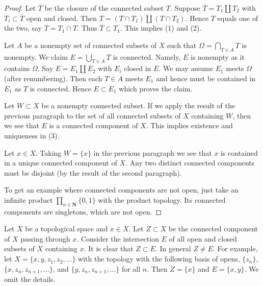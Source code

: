 \begin{proof}
Let $\overline{T}$ be the closure of the connected subset $T$.
Suppose $\overline{T} = T_1 \amalg T_2$ with $T_i \subset \overline{T}$
open and closed. Then $T = (T\cap T_1) \amalg (T \cap T_2)$. Hence
$T$ equals one of the two, say $T = T_1 \cap T$. Thus
$\overline{T} \subset T_1$. This implies (1) and (2).

\medskip\noindent
Let $A$ be a nonempty set of connected subsets of $X$ such that
$\Omega = \bigcap_{T \in A} T$ is nonempty. We claim $E = \bigcup_{T \in A} T$
is connected. Namely, $E$ is nonempty as it contains $\Omega$.
Say $E = E_1 \amalg E_2$ with $E_i$ closed in $E$. We may assume
$E_1$ meets $\Omega$ (after renumbering). Then each $T \in A$ meets $E_1$
and hence must be contained in $E_1$ as $T$ is connected. Hence $E \subset E_1$
which proves the claim.

\medskip\noindent
Let $W \subset X$ be a nonempty connected subset.
If we apply the result of the previous paragraph to the set of all
connected subsets of $X$ containing $W$, then we see that $E$ is
a connected component of $X$. This implies existence and uniqueness in (3).

\medskip\noindent
Let $x \in X$. Taking $W = \{x\}$ in the previous paragraph
we see that $x$ is contained in a unique connected component of $X$.
Any two distinct connected components must be disjoint (by the
result of the second paragraph).

\medskip\noindent
To get an example where connected components are not open, just take
an infinite product $\prod_{n \in \mathbf{N}} \{0, 1\}$
with the product topology. Its connected components are singletons,
which are not open.
\end{proof}

\begin{remark}
\label{remark-quasi-components}
\begin{reference}
\cite[Example 6.1.24]{Engelking}
\end{reference}
Let $X$ be a topological space and $x \in X$. Let $Z \subset X$ be the
connected component of $X$ passing through $x$. Consider the intersection
$E$ of all open and closed subsets of $X$ containing $x$. It is clear that
$Z \subset E$. In general $Z \not = E$. For example, let
$X = \{x, y, z_1, z_2, \ldots\}$ with the topology with the following
basis of opens, $\{z_n\}$, $\{x, z_n, z_{n + 1}, \ldots\}$, and
$\{y, z_n, z_{n + 1}, \ldots\}$ for all $n$. Then $Z = \{x\}$ and
$E = \{x, y\}$. We omit the details.
\end{remark}


